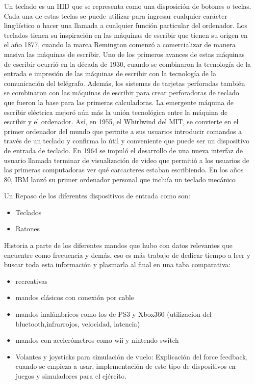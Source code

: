 Un teclado es un HID que se representa como una disposici\'on de botones o teclas. Cada una de estas teclas se puede utilizar para ingresar cualquier car\'acter ling\"u\'istico o hacer una llamada a cualquier funci\'on particular del ordenador. Los teclados  tienen su inspiraci\'on en las m\'aquinas de escribir que tienen su origen en el a\~no 1877, cuando la marca Remington comenz\'o a comercializar de manera masiva las m\'aquinas de escribir. Uno de los primeros avances de estas m\'aquinas de escribir ocurri\'o en la d\'ecada de 1930, cuando se combinaron la tecnolog\'ia de la entrada e impresi\'on de las m\'aquinas de escribir con la tecnolog\'ia de la comunicaci\'on del tel\'egrafo. Adem\'as, los sistemas de tarjetas perforadas tambi\'en se combinaron con las m\'aquinas de escribir para crear perforadoras de teclado que fueron la base para las primeras calculadoras. La emergente m\'aquina de escribir el\'ectrica mejor\'o a\'un m\'as la uni\'on tecnol\'ogica entre la m\'aquina de escribir y el ordenador. As\'i, en 1955, el Whirlwind del MIT, se convierte en el primer ordenador del mundo que permite a sus usuarios introducir comandos a trav\'es de un teclado y confirma lo \'util y conveniente que puede ser un dispositivo de entrada de teclado. En 1964 se impul\'o el desarrollo de una nueva interfaz de usuario llamada terminar de visualizaci\'on de video que permiti\'o a los usuarios de las primeras computadoras ver qu\'e carcacteres estaban escribiendo. En los a\~nos 80, IBM lanz\'o su primer ordenador personal que inclu\'ia un teclado mec\'anico 


Un 
Repaso de los diferentes dispositivos de entrada como son:
\begin {itemize}

\item Teclados
\item Ratones

\end {itemize}


Historia a parte de los diferentes mandos que hubo con datos relevantes que encuentre como frecuencia y dem\'as, eso es m\'as trabajo de dedicar tiempo a leer y buscar toda esta informaci\'on y plasmarla al final en una taba comparativa:
\begin {itemize}
\item recreativas
\item mandos cl\'asicos con conexi\'on por cable
\item mandos inal\'ambricos como los de PS3 y Xbox360 (utilizacion del bluetooth,infrarrojos, velocidad, latencia)
\item mandos con aceler\'ometros como wii y nintendo switch
\item Volantes y joysticks para simulaci\'on de vuelo: Explicaci\'on del force feedback, cuando se empieza a usar, implementaci\'on de este tipo de dispositivos en juegos y simuladores para el ej\'ercito.
\end {itemize}

